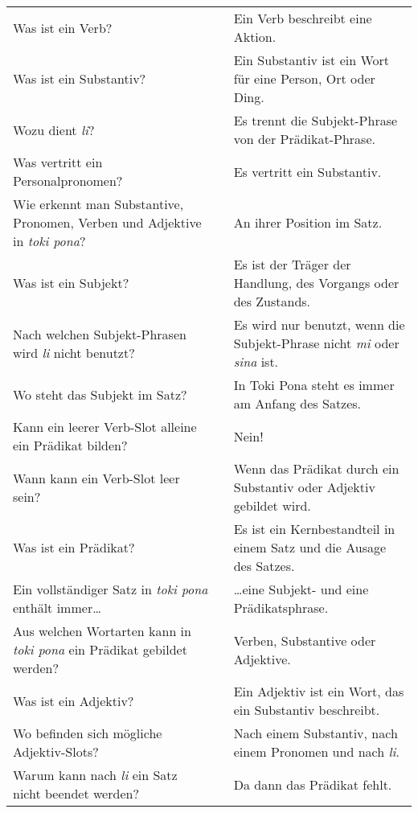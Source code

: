 \begin{supertabular}{p{5,5cm}|ll}
Was ist ein Verb? && Ein Verb beschreibt eine Aktion. \\  %
Was ist ein Substantiv? && Ein Substantiv ist ein Wort für eine Person, Ort oder Ding. \\  %
Wozu dient \textit{li}? && Es trennt die Subjekt-Phrase von der Prädikat-Phrase.  \\ %
Was vertritt ein Personalpronomen? && Es vertritt ein Substantiv. \\ %
Wie erkennt man Substantive, Pronomen, Verben und Adjektive in \textit{toki pona}? && An ihrer Position im Satz. \\  %
Was ist ein Subjekt? && Es ist der Träger der Handlung, des Vorgangs oder des Zustands. \\ %
Nach welchen Subjekt-Phrasen wird \textit{li} nicht benutzt? && Es wird nur benutzt, wenn die Subjekt-Phrase nicht \textit{mi} oder \textit{sina} ist.  \\  %
Wo steht das Subjekt im Satz? && In Toki Pona steht es immer am Anfang des Satzes. \\  %
Kann ein leerer Verb-Slot alleine ein Prädikat bilden? && Nein!  \\  %
Wann kann ein Verb-Slot leer sein? && Wenn das Prädikat durch ein Substantiv oder Adjektiv gebildet wird.  \\  %
Was ist ein Prädikat? && Es ist ein Kernbestandteil in einem Satz und die Ausage des Satzes. \\  %
Ein vollständiger Satz in \textit{toki pona} enthält immer\dots && \dots eine Subjekt- und eine Prädikatsphrase.  \\  %
Aus welchen Wortarten kann in \textit{toki pona} ein Prädikat gebildet werden? && Verben, Substantive oder Adjektive.  \\  %
Was ist ein Adjektiv? && Ein Adjektiv ist ein Wort, das ein Substantiv beschreibt.  \\ %
Wo befinden sich mögliche Adjektiv-Slots? && Nach einem Substantiv, nach einem Pronomen und nach \textit{li}.  \\  %
Warum kann nach \textit{li} ein Satz nicht beendet werden? && Da dann das Prädikat fehlt. \\ %
\end{supertabular} 

